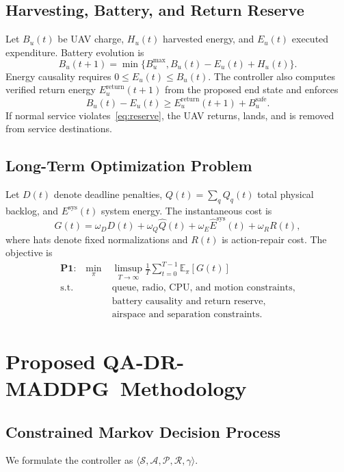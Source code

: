 \documentclass[journal]{IEEEtran}
\newcommand{\method}{QA-DR-MADDPG}
\newcommand{\E}{\mathbb{E}}
\begin{document}
\subsection{Harvesting, Battery, and Return Reserve}
Let $B_u(t)$ be UAV charge, $H_u(t)$ harvested energy, and $E_u(t)$ executed
expenditure. Battery evolution is
\begin{equation}
B_u(t+1)=\min\{B_u^{\max},B_u(t)-E_u(t)+H_u(t)\}.
\end{equation}
Energy causality requires $0\le E_u(t)\le B_u(t)$. The controller also
computes verified return energy $E_u^{\mathrm{return}}(t+1)$ from the proposed
end state and enforces
\begin{equation}
B_u(t)-E_u(t)\ge E_u^{\mathrm{return}}(t+1)+B_u^{\mathrm{safe}}.
\label{eq:reserve}
\end{equation}
If normal service violates~\eqref{eq:reserve}, the UAV returns, lands, and is
removed from service destinations.

\subsection{Long-Term Optimization Problem}
Let $D(t)$ denote deadline penalties, $Q(t)=\sum_q Q_q(t)$ total physical
backlog, and $E^{\mathrm{sys}}(t)$ system energy. The instantaneous cost is
\begin{equation}
G(t)=\omega_DD(t)+\omega_Q\widehat Q(t)+
\omega_E\widehat E^{\mathrm{sys}}(t)+\omega_RR(t),
\end{equation}
where hats denote fixed normalizations and $R(t)$ is action-repair cost. The
objective is
\begin{align}
\textbf{P1:}\quad
\min_{\pi}\;&\limsup_{T\to\infty}\frac{1}{T}
\sum_{t=0}^{T-1}\E_\pi[G(t)]\\
\text{s.t. }&\text{queue, radio, CPU, and motion constraints,}\\
&\text{battery causality and return reserve,}\\
&\text{airspace and separation constraints.}
\end{align}

\fi

\iffalse
\section{Proposed \method\ Methodology}
\subsection{Constrained Markov Decision Process}
We formulate the controller as
$\langle\mathcal S,\mathcal A,\mathcal P,\mathcal R,\gamma\rangle$.
\end{document}
